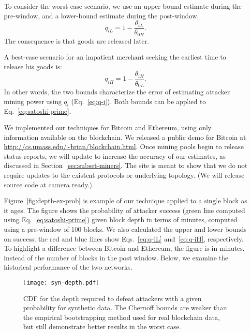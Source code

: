 \documentclass[10pt,sigconf]{acmart}
\newcommand{\para }[1]{\smallskip \noindent {\bf #1}}
\newcommand{\1}{{\em (i)}}
\newcommand{\2}{{\em (ii)}}
\newcommand{\3}{{\em (iii)}}
\newcommand{\4}{{\em (iv)}}
\newcommand{\5}{{\em (v)}}
\begin{document}
To consider the worst-case
scenario, we use an upper-bound estimate during the pre-window, and a lower-bound estimate during the post-window.
\begin{equation}
q_{iL}=1-\frac{\theta_{iL}}{\theta_{0H}}.\label{eq:q-iL}
\end{equation}
The consequence is that goods are released later. 

A best-case scenario for an impatient merchant seeking the earliest time to release his goods is:
\begin{equation}
q_{iH}=1-\frac{\theta_{iH}}{\theta_{0L}}.\label{eq:q-iH}
\end{equation}
In other words, the two bounds characterize the error of estimating attacker mining power using $q_i$ (Eq.~\ref{eq:q-i}). Both bounds can be applied to Eq.~\ref{eq:satoshi-prime}.



\para{Implementation.} 
We implemented our techniques for Bitcoin and Ethereum,
using only information available on the blockchain.  We released a 
public demo for Bitcoin at \url{http://cs.umass.edu/~brian/blockchain.html}.
Once mining pools
begin to release status reports, we will  update to increase the accuracy of our estimates, as discussed in Section~\ref{sec:subset-miners}.  The site is meant to show that we do not require
updates to the existent protocols or underlying topology. (We will  release source code at camera ready.)




\para{Example output.}
Figure~\ref{fig:depth-ex-prob} is  example of our technique applied to a single block as it ages. The figure shows the probability of attacker success (green line computed using Eq.~\ref{eq:satoshi-prime}) given block depth in terms of minutes, computed using a pre-window of 100 blocks. We also calculated the upper and lower bounds on success; the red and blue lines show Eqs.~\ref{eq:q-iL} and~\ref{eq:q-iH}, respectively. 
To highlight a difference between Bitcoin and 
Ethereum, the figure is in minutes, instead of the number of blocks in  the post window. Below, we examine the historical performance of the two networks. 



\begin{figure}[t] 
   \centering
   \texttt{[image: syn-depth.pdf]}
   \caption{CDF for the depth required to defeat attackers with a
     given probability for synthetic data. The Chernoff bounds are
     weaker than the empirical bootstrapping method used for real
     blockchain data, but still demonstrate better results in the worst case.}
   \label{fig:depth-syn}
\end{figure}
\end{document}
